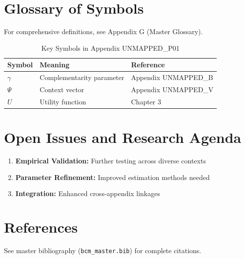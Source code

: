 \section{Glossary of Symbols}
\label{sec:p01-glossary}

For comprehensive definitions, see Appendix G (Master Glossary).

\begin{table}[htbp]
\centering
\caption{Key Symbols in Appendix UNMAPPED_P01}
\begin{tabular}{lll}
\toprule
\textbf{Symbol} & \textbf{Meaning} & \textbf{Reference} \\
\midrule
$\gamma$ & Complementarity parameter & Appendix UNMAPPED_B \\
$\Psi$ & Context vector & Appendix UNMAPPED_V \\
$U$ & Utility function & Chapter 3 \\
\bottomrule
\end{tabular}
\end{table}



\section{Open Issues and Research Agenda}
\label{sec:p01-open}

\begin{enumerate}
    \item \textbf{Empirical Validation:} Further testing across diverse contexts
    \item \textbf{Parameter Refinement:} Improved estimation methods needed
    \item \textbf{Integration:} Enhanced cross-appendix linkages
\end{enumerate}

\section{References}
\label{sec:p01-references}

See master bibliography (\texttt{bcm\_master.bib}) for complete citations.

\nocite{bcm_master}

